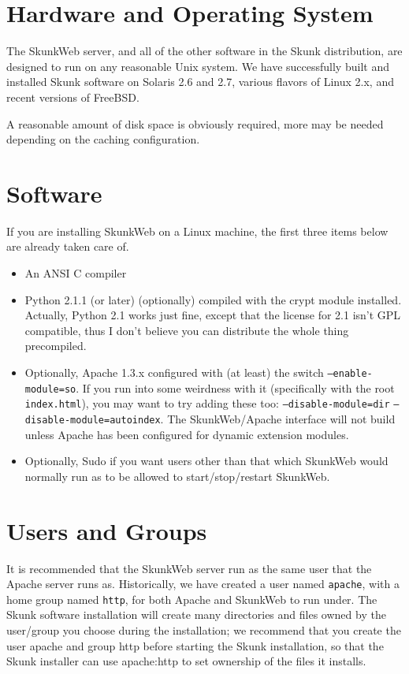 \documentclass[titlepage]{manual}
\begin{document}
\section{Hardware and Operating System}
   The SkunkWeb server, and all of the other software in the Skunk
   distribution, are designed to run on any reasonable Unix system. We
   have successfully built and installed Skunk software on Solaris 2.6
   and 2.7, various flavors of Linux 2.x, and recent versions of
   FreeBSD.
   
   A reasonable amount of disk space is obviously required, more may
   be needed depending on the caching configuration.

\section{Software}
If you are installing SkunkWeb on a Linux machine, the first three
items below are already taken care of.

\begin{itemize}
\item An ANSI C compiler
\item Python 2.1.1 (or later) (optionally) compiled with the crypt
module installed.  Actually, Python 2.1 works just fine, except that
the license for 2.1 isn't GPL compatible, thus I don't believe you can
distribute the whole thing precompiled.

\item Optionally, Apache 1.3.x configured with (at least) the switch
\texttt{--enable-module=so}.  If you run into some weirdness with it
(specifically with the root \texttt{index.html}), you may want to try
adding these too: \texttt{--disable-module=dir}
\texttt{--disable-module=autoindex}.  The SkunkWeb/Apache interface
will not build unless Apache has been configured for dynamic extension
modules.

\item Optionally, Sudo if you want users other than that which
SkunkWeb would normally run as to be allowed to start/stop/restart
SkunkWeb.

\end{itemize}

\section{Users and Groups}
It is recommended that the SkunkWeb server run as the same user that
the Apache server runs as. Historically, we have created a user named
\texttt{apache}, with a home group named \texttt{http}, for both
Apache and SkunkWeb to run under. The Skunk software installation will
create many directories and files owned by the user/group you choose
during the installation; we recommend that you create the user apache
and group http before starting the Skunk installation, so that the
Skunk installer can use apache:http to set ownership of the files it
installs.
     
\end{document}
